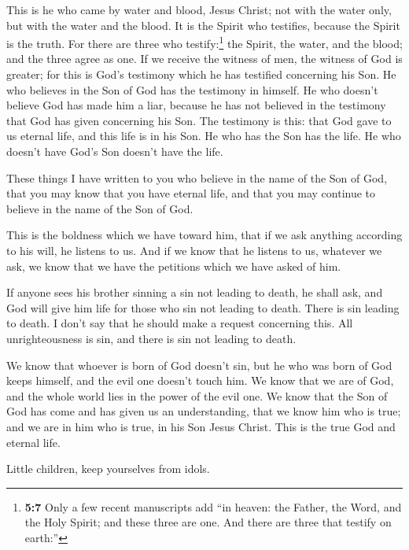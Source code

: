  This is he who came by water and blood, Jesus Christ; not
with the water only, but with the water and the blood. It is the Spirit
who testifies, because the Spirit is the truth.  For there
are three who testify:\footnote{\textbf{5:7} Only a few recent
  manuscripts add ``in heaven: the Father, the Word, and the Holy
  Spirit; and these three are one. And there are three that testify on
  earth:''}  the Spirit, the water, and the blood; and the
three agree as one.  If we receive the witness of men, the
witness of God is greater; for this is God's testimony which he has
testified concerning his Son.  He who believes in the Son
of God has the testimony in himself. He who doesn't believe God has made
him a liar, because he has not believed in the testimony that God has
given concerning his Son.  The testimony is this: that
God gave to us eternal life, and this life is in his Son.
 He who has the Son has the life. He who doesn't have
God's Son doesn't have the life.

 These things I have written to you who believe in the
name of the Son of God, that you may know that you have eternal life,
and that you may continue to believe in the name of the Son of God.

 This is the boldness which we have toward him, that if
we ask anything according to his will, he listens to us. 
And if we know that he listens to us, whatever we ask, we know that we
have the petitions which we have asked of him.

 If anyone sees his brother sinning a sin not leading to
death, he shall ask, and God will give him life for those who sin not
leading to death. There is sin leading to death. I don't say that he
should make a request concerning this.  All
unrighteousness is sin, and there is sin not leading to death.

 We know that whoever is born of God doesn't sin, but he
who was born of God keeps himself, and the evil one doesn't touch him.
 We know that we are of God, and the whole world lies in
the power of the evil one.  We know that the Son of God
has come and has given us an understanding, that we know him who is
true; and we are in him who is true, in his Son Jesus Christ. This is
the true God and eternal life.

 Little children, keep yourselves from idols.
